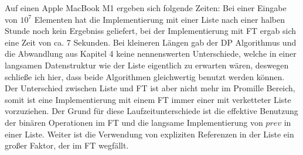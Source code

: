 Auf einen Apple MacBook M1 ergeben sich folgende Zeiten: Bei einer Eingabe von $10^7$ Elementen hat die Implementierung mit einer Liste nach einer halben Stunde noch kein Ergebniss geliefert, bei der Implementierung mit FT ergab sich eine Zeit von ca. 7 Sekunden. Bei kleineren Längen gab der DP Algorithmus und die Abwandlung aus Kapitel 4 keine nennenswerten Unterschiede, welche in einer langsamen Datenstruktur wie der Liste eigentlich zu erwarten wären, deswegen schließe ich hier, dass beide Algorithmen gleichwertig benutzt werden können. Der Unterschied zwischen Liste und FT ist aber nicht mehr im Promille Bereich, somit ist eine Implementierung mit einem FT immer einer mit verketteter Liste vorzuziehen. Der Grund für diese Laufzeitunterschiede ist die effektive Benutzung der binären Operationen im FT und die langsame Implementierung von $prev$ in einer Liste. Weiter ist die Verwendung von expliziten Referenzen in der Liste ein großer Faktor, der im FT wegfällt. 